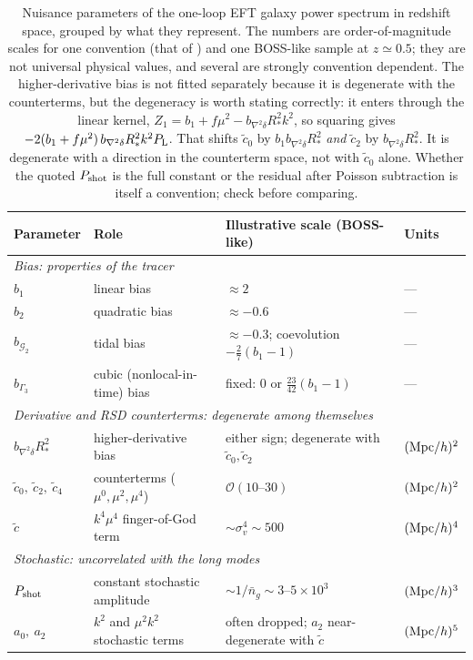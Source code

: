 \documentclass[a4paper,11pt]{article}
\def\Plin{P_{\rm L}}
\def\G{\mathcal{G}}
\numberwithin{equation}{section}
\begin{document}
\begin{table}[t]
\centering
\small
\begin{tabular}{llll}
\toprule
Parameter & Role & Illustrative scale (BOSS-like) & Units \\
\midrule
\multicolumn{4}{l}{\emph{Bias: properties of the tracer}}\\
$b_1$ & linear bias & $\approx 2$ & --- \\
$b_2$ & quadratic bias & $\approx -0.6$ & --- \\
$b_{\G_2}$ & tidal bias & $\approx -0.3$; coevolution $-\tfrac27(b_1{-}1)$ & --- \\
$b_{\Gamma_3}$ & cubic (nonlocal-in-time) bias & fixed: $0$ or $\tfrac{23}{42}(b_1{-}1)$ & --- \\
\midrule
\multicolumn{4}{l}{\emph{Derivative and RSD counterterms: degenerate among themselves}}\\
$b_{\nabla^2\delta}R_*^2$ & higher-derivative bias & either sign; degenerate with $\tilde c_0,\tilde c_2$ & $({\rm Mpc}/h)^2$ \\
$\tilde c_0,\ \tilde c_2,\ \tilde c_4$ & counterterms ($\mu^0,\mu^2,\mu^4$) & $\mathcal{O}(10\text{--}30)$ & $({\rm Mpc}/h)^2$ \\
$\tilde c$ & $k^4\mu^4$ finger-of-God term & $\sim\sigma_v^4 \sim 500$ & $({\rm Mpc}/h)^4$ \\
\midrule
\multicolumn{4}{l}{\emph{Stochastic: uncorrelated with the long modes}}\\
$P_{\rm shot}$ & constant stochastic amplitude & $\sim 1/\bar n_g \sim 3\text{--}5\times10^3$ & $({\rm Mpc}/h)^3$ \\
$a_0,\ a_2$ & $k^2$ and $\mu^2k^2$ stochastic terms & often dropped; $a_2$ near-degenerate with $\tilde c$ & $({\rm Mpc}/h)^5$ \\
\bottomrule
\end{tabular}
\caption{Nuisance parameters of the one-loop EFT galaxy power spectrum in redshift space, grouped by what they represent. The numbers are order-of-magnitude scales for one convention (that of \cite{ClassPT2020,ChudaykinIvanov2019}) and one BOSS-like sample at $z\simeq0.5$; they are not universal physical values, and several are strongly convention dependent. The higher-derivative bias is not fitted separately because it is degenerate with the counterterms, but the degeneracy is worth stating correctly: it enters through the linear kernel, $Z_1 = b_1 + f\mu^2 - b_{\nabla^2\delta}R_*^2k^2$, so squaring gives $-2(b_1+f\mu^2)\,b_{\nabla^2\delta}R_*^2k^2\Plin$. That shifts $\tilde c_0$ by $b_1 b_{\nabla^2\delta}R_*^2$ \emph{and} $\tilde c_2$ by $b_{\nabla^2\delta}R_*^2$. It is degenerate with a direction in the counterterm space, not with $\tilde c_0$ alone. Whether the quoted $P_{\rm shot}$ is the full constant or the residual after Poisson subtraction is itself a convention; check before comparing.}
\label{tab:params}
\end{table}
\end{document}
